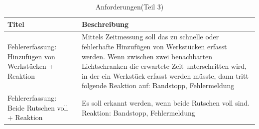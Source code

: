 \documentclass[a4paper, 11pt]{article}
\begin{document}
\newpage

\begin{table}[h]
\center
\begin{tabularx}{\textwidth}{|X|X|}
\hline
\textbf{Titel}&\textbf{Beschreibung}\\
\hline
Fehlererfassung: Hinzufügen von Werkstücken + Reaktion&Mittels Zeitmessung soll das zu schnelle oder fehlerhafte Hinzufügen von Werkstücken erfasst werden. Wenn zwischen zwei benachbarten Lichtschranken die erwartete Zeit unterschritten wird, in der ein Werkstück erfasst werden müsste, dann tritt folgende Reaktion auf: Bandstopp, Fehlermeldung \\
\hline
Fehlererfassung: Beide Rutschen voll + Reaktion&Es soll erkannt werden, wenn beide Rutschen voll sind. Reaktion: Bandstopp, Fehlermeldung \\
\hline
\end{tabularx}
\caption{Anforderungen(Teil 3)}
\label{anf3}
\end{table}

\newpage
\end{document}
